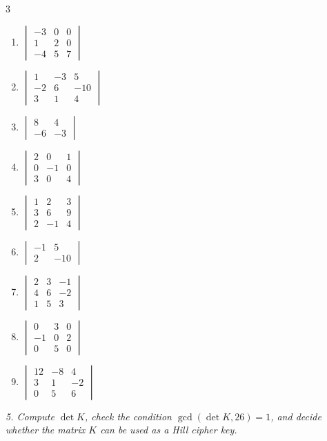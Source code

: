 \begin{multicols}{3}
\begin{enumerate}[label=\arabic*.,  leftmargin=*]
\item $\begin{vmatrix} -3 & 0 & 0 \\ 1 & 2 & 0 \\ -4 & 5 & 7 \end{vmatrix}$
\item $\begin{vmatrix} 1 & -3 & 5 \\ -2 & 6 & -10 \\ 3 & 1 & 4 \end{vmatrix}$
\item $\begin{vmatrix} 8 & 4 \\ -6 & -3 \end{vmatrix}$
\item $\begin{vmatrix} 2 & 0 & 1 \\ 0 & -1 & 0 \\ 3 & 0 & 4 \end{vmatrix}$
\item $\begin{vmatrix} 1 & 2 & 3 \\ 3 & 6 & 9 \\ 2 & -1 & 4 \end{vmatrix}$
\item $\begin{vmatrix} -1 & 5 \\ 2 & -10 \end{vmatrix}$
\item $\begin{vmatrix} 2 & 3 & -1 \\ 4 & 6 & -2 \\ 1 & 5 & 3 \end{vmatrix}$
\item $\begin{vmatrix} 0 & 3 & 0 \\ -1 & 0 & 2 \\ 0 & 5 & 0 \end{vmatrix}$
\item $\begin{vmatrix} 12 & -8 & 4 \\ 3 & 1 & -2 \\ 0 & 5 & 6 \end{vmatrix}$
\end{enumerate}
\end{multicols}
\emph{5. Compute $\det K$, check the condition $\gcd(\det K, 26) = 1$, and decide whether the matrix $K$ can be used as a Hill cipher key.}
